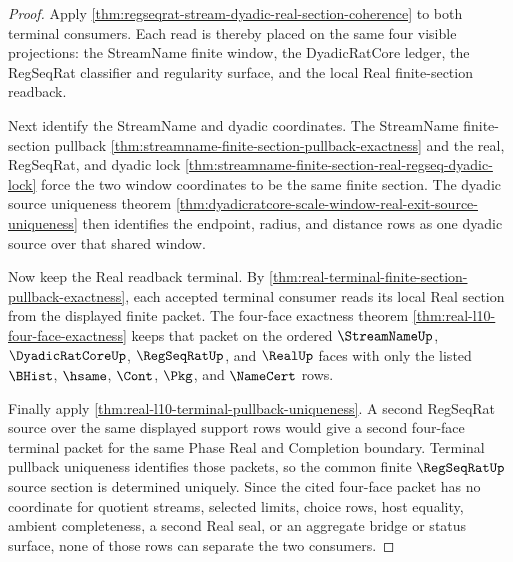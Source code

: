 \begin{proof}
Apply \autoref{thm:regseqrat-stream-dyadic-real-section-coherence} to both
terminal consumers. Each read is thereby placed on the same four visible
projections: the StreamName finite window, the DyadicRatCore ledger, the
RegSeqRat classifier and regularity surface, and the local Real
finite-section readback.

Next identify the StreamName and dyadic coordinates. The StreamName
finite-section pullback
\autoref{thm:streamname-finite-section-pullback-exactness} and the real,
RegSeqRat, and dyadic lock
\autoref{thm:streamname-finite-section-real-regseq-dyadic-lock} force the two
window coordinates to be the same finite section. The dyadic source
uniqueness theorem
\autoref{thm:dyadicratcore-scale-window-real-exit-source-uniqueness} then
identifies the endpoint, radius, and distance rows as one dyadic source over
that shared window.

Now keep the Real readback terminal. By
\autoref{thm:real-terminal-finite-section-pullback-exactness}, each accepted
terminal consumer reads its local Real section from the displayed finite
packet. The four-face exactness theorem
\autoref{thm:real-l10-four-face-exactness} keeps that packet on the ordered
$\StreamNameUp$, $\DyadicRatCoreUp$, $\RegSeqRatUp$, and $\RealUp$ faces with
only the listed $\BHist$, $\hsame$, $\Cont$, $\Pkg$, and $\NameCert$ rows.

Finally apply \autoref{thm:real-l10-terminal-pullback-uniqueness}. A second
RegSeqRat source over the same displayed support rows would give a second
four-face terminal packet for the same Phase Real and Completion boundary.
Terminal pullback uniqueness identifies those packets, so the common finite
$\RegSeqRatUp$ source section is determined uniquely. Since the cited
four-face packet has no coordinate for quotient streams, selected limits,
choice rows, host equality, ambient completeness, a second Real seal, or an
aggregate bridge or status surface, none of those rows can separate the two
consumers.
\end{proof}

